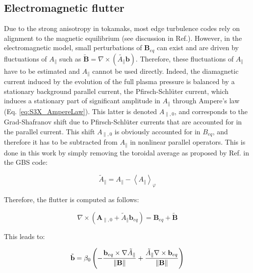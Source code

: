 \subsection{Electromagnetic flutter}
\label{ssec:S3X_flutter}
Due to the strong anisotropy in tokamaks, most edge turbulence codes rely on alignment to the magnetic equilibrium (see discussion in Ref.\cite{SCHWANDER_2024}). However, in the electromagnetic model, small perturbations of $\mathbf{B}_{eq}$ can exist and are driven by fluctuations of $A_\parallel$ such as $\tilde{\mathbf{B}} = \nabla \times (\tilde{A_\parallel} \mathbf{b})$. Therefore, these fluctuations of $A_\parallel$ have to be estimated and $A_\parallel$ cannot be used directly. Indeed, the diamagnetic current induced by the evolution of the full plasma pressure is balanced by a stationary background parallel current, the Pfirsch-Schlüter current, which induces a stationary part of significant amplitude in $A_\parallel$ through Ampere's law (Eq. \ref{eq:S3X_AmpereLaw}). This latter is denoted $A_{\parallel,0}$, and corresponds to the Grad-Shafranov shift due to Pfirsch-Schlüter currents that are accounted for in the parallel current. This shift $A_{\parallel,0}$ is obviously accounted for in $B_{eq}$, and therefore it has to be subtracted from $A_\parallel$ in nonlinear parallel operators. This is done in this work by simply removing the toroidal average as proposed by Ref.\cite{giacomin2022gbs} in the GBS code: \newline

\begin{equation}
	\tilde{A}_\parallel = A_\parallel - \left<A_\parallel\right>_\varphi \label{eq:averagedAParallel}
\end{equation}

Therefore, the flutter is computed as follows: \newline

\begin{equation}
	\nabla \times \left( \mathbf{A}_{\parallel,0} + \tilde{A}_\parallel \mathbf{b}_{eq} \right) = \mathbf{B}_{eq} + \tilde{\mathbf{B}} 
	\label{eq:definitionMagneticFieldWithFlutter}
\end{equation}

This leads to: 

\begin{equation}
	\tilde{\mathbf{b}} = \beta_0 \left(- \frac{\mathbf{b}_{eq} \times \nabla \tilde{A}_\parallel}{\norm{\mathbf{B}}} + \frac{\tilde{A}_\parallel \nabla \times \mathbf{b}_{eq}}{\norm{\mathbf{B}}}\right)
	\label{eq:definitionMagneticFieldWithFlutter_1}
\end{equation}

